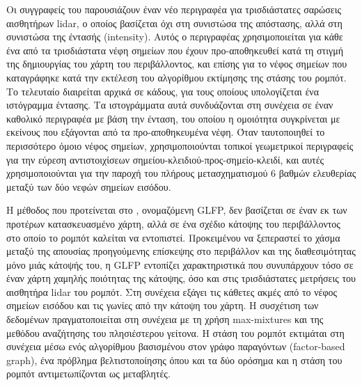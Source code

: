 Οι συγγραφείς του \cite{Cop2018} παρουσιάζουν έναν νέο περιγραφέα για
τρισδιάστατες σαρώσεις αισθητήρων lidar, ο οποίος βασίζεται όχι στη συνιστώσα
της απόστασης, αλλά στη συνιστώσα της έντασής (intensity). Αυτός ο περιγραφέας
χρησιμοποιείται για κάθε ένα από τα τρισδιάστατα νέφη σημείων που έχουν
προ-αποθηκευθεί κατά τη στιγμή της δημιουργίας του χάρτη του περιβάλλοντος, και
επίσης για το νέφος σημείων που καταγράφηκε κατά την εκτέλεση του αλγορίθμου
εκτίμησης της στάσης του ρομπότ. Το τελευταίο διαιρείται αρχικά σε κάδους, για
τους οποίους υπολογίζεται ένα ιστόγραμμα έντασης. Τα ιστογράμματα αυτά
συνδυάζονται στη συνέχεια σε έναν καθολικό περιγραφέα με βάση την ένταση, του
οποίου η ομοιότητα συγκρίνεται με εκείνους που εξάγονται από τα
προ-αποθηκευμένα νέφη. Όταν ταυτοποιηθεί το περισσότερο όμοιο νέφος σημείων,
χρησιμοποιούνται τοπικοί γεωμετρικοί περιγραφείς για την εύρεση αντιστοιχίσεων
σημείου-κλειδιού-προς-σημείο-κλειδί, και αυτές χρησιμοποιούνται για την παροχή
του πλήρους μετασχηματισμού $6$ βαθμών ελευθερίας μεταξύ των δύο νεφών σημείων
εισόδου.

Η μέθοδος που προτείνεται στο \cite{Wang2019a}, ονομαζόμενη GLFP, δεν βασίζεται
σε έναν εκ των προτέρων κατασκευασμένο χάρτη, αλλά σε ένα σχέδιο κάτοψης του
περιβάλλοντος στο οποίο το ρομπότ καλείται να εντοπιστεί. Προκειμένου να
ξεπεραστεί το χάσμα μεταξύ της απουσίας προηγούμενης επίσκεψης στο περιβάλλον
και της διαθεσιμότητας μόνο μιάς κάτοψής του, η GLFP εντοπίζει χαρακτηριστικά
που συνυπάρχουν τόσο σε έναν χάρτη χαμηλής ποιότητας της κάτοψης, όσο και στις
τρισδιάστατες μετρήσεις του αισθητήρα lidar του ρομπότ.  Στη συνέχεια εξάγει
τις κάθετες ακμές από το νέφος σημείων εισόδου και τις γωνίες από την κάτοψη
του χάρτη. Η συσχέτιση των δεδομένων πραγματοποιείται στη συνέχεια με τη χρήση
max-mixtures \cite{Olson2013} και της μεθόδου αναζήτησης του πλησιέστερου
γείτονα.  Η στάση του ρομπότ εκτιμάται στη συνέχεια μέσω ενός αλγορίθμου
βασισμένου στον γράφο παραγόντων (factor-based graph), ένα πρόβλημα
βελτιστοποίησης όπου και τα δύο ορόσημα και η στάση του ρομπότ αντιμετωπίζονται
ως μεταβλητές.

